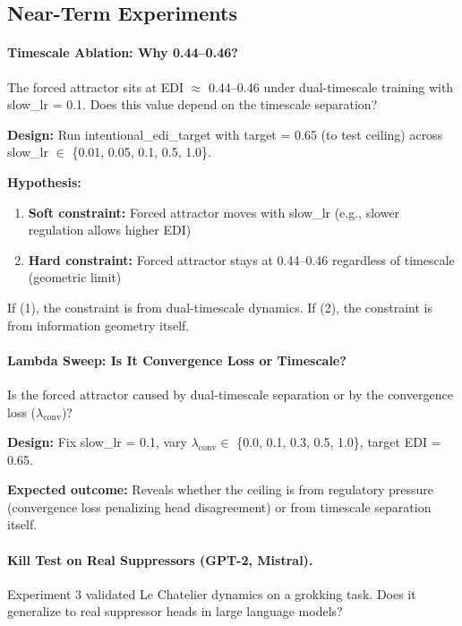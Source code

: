 \subsection{Near-Term Experiments}

\paragraph{Timescale Ablation: Why 0.44--0.46?}
The forced attractor sits at EDI $\approx$ 0.44--0.46 under dual-timescale training with slow\_lr = 0.1. Does this value depend on the timescale separation?

\textbf{Design:} Run intentional\_edi\_target with target = 0.65 (to test ceiling) across slow\_lr $\in$ \{0.01, 0.05, 0.1, 0.5, 1.0\}.

\textbf{Hypothesis:}
\begin{enumerate}
\item \textbf{Soft constraint:} Forced attractor moves with slow\_lr (e.g., slower regulation allows higher EDI)
\item \textbf{Hard constraint:} Forced attractor stays at 0.44--0.46 regardless of timescale (geometric limit)
\end{enumerate}

If (1), the constraint is from dual-timescale dynamics. If (2), the constraint is from information geometry itself.

\paragraph{Lambda Sweep: Is It Convergence Loss or Timescale?}
Is the forced attractor caused by dual-timescale separation or by the convergence loss ($\lambda_{\text{conv}}$)?

\textbf{Design:} Fix slow\_lr = 0.1, vary $\lambda_{\text{conv}} \in$ \{0.0, 0.1, 0.3, 0.5, 1.0\}, target EDI = 0.65.

\textbf{Expected outcome:} Reveals whether the ceiling is from regulatory pressure (convergence loss penalizing head disagreement) or from timescale separation itself.

\paragraph{Kill Test on Real Suppressors (GPT-2, Mistral).}
Experiment 3 validated Le Chatelier dynamics on a grokking task. Does it generalize to real suppressor heads in large language models?

